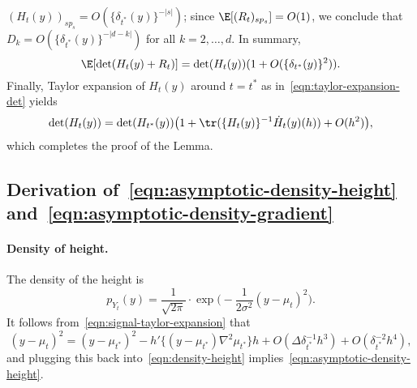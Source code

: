 \documentclass{article}
\begin{document}
	$(H_t(y))_{sp_s} = O(\{\delta_{t^*}(y)\}^{-|s|})$; since $\E[(R_t)_{sp_s}] = O(1)$, we conclude that $D_k = O(\{\delta_{t^*}(y)\}^{-|d - k|})$ for all $k = 2,\ldots,d$. In summary,
	\begin{equation*}
		\E[\det(H_t(y) + R_t)] = \det(H_t(y))(1 +  O(\{\delta_{t^*}(y)\}^2)). 
	\end{equation*}
	Finally, Taylor expansion of $H_t(y)$ around $t = t^*$ as in~\eqref{eqn:taylor-expansion-det} yields
	\begin{equation*}
		\det(H_t(y)) = \det(H_{t^*}(y))\big(1 + \tr(\{H_t(y)\}^{-1} \dot{H}_t(y)(h)) + O(h^2)\big),
	\end{equation*}
	which completes the proof of the Lemma.
	
	\subsection{Derivation of~\eqref{eqn:asymptotic-density-height} and~\eqref{eqn:asymptotic-density-gradient}}
	\label{subsec:asymptotic-analysis-density}
	
	\paragraph{Density of height.}
	The density of the height is
	\begin{equation}
		\label{eqn:density-height}
		p_{Y_t}(y) = \frac{1}{\sqrt{2\pi}} \cdot \exp\Big(-\frac{1}{2\sigma^2} (y - \mu_t)^2\Big).
	\end{equation}
	It follows from~\eqref{eqn:signal-taylor-expansion} that
	\begin{equation*}
		(y - \mu_t)^2 = (y - \mu_{t^*})^2 - h'\{(y - \mu_{t^*})\nabla^2\mu_{t^*}\}h + O(\Delta \delta_{t^*}^{-1}h^3) + O(\delta_{t^*}^{-2}h^4),	
	\end{equation*}
	and plugging this back into~\eqref{eqn:density-height} implies~\eqref{eqn:asymptotic-density-height}. 
	
\end{document}
